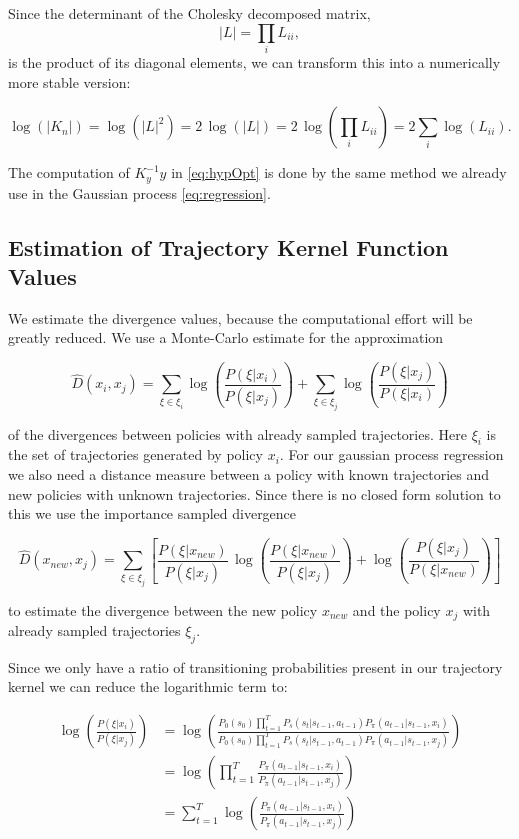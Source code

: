 Since the determinant of the Cholesky decomposed matrix,
$$|L| = \textstyle\prod_{i} L_{ii},$$
is the product of its diagonal elements, we can transform this into a numerically more stable version:

$$\log(|K_n|) = \log(|L|^{2}) = 2\,\log(|L|) = 2\,\log(\textstyle\prod_{i} L_{ii}) = 2\textstyle\sum_{i} \log(L_{ii}).$$

The computation of $K_y^{-1}y$ in \eqref{eq:hypOpt} is done by the same method we already use in the Gaussian process \eqref{eq:regression}.

\subsection{Estimation of Trajectory Kernel Function Values}

We estimate the divergence values, because the computational effort will be greatly reduced\cite{wilson2014using}. We use a Monte-Carlo estimate for the approximation

$$\hat{D}(x_{ i }, x_{ j }) = \sum _{\xi \in \xi_i} \log\left( \frac{P(\xi|x_{ i })}{P(\xi|x_{ j })} \right) + \sum _{\xi \in \xi_j} \log\left( \frac{P(\xi|x_{ j })}{P(\xi|x_{ i })} \right) $$

of the divergences between policies with already sampled trajectories. Here $\xi_i$ is the set of trajectories generated by policy $x_i$. For our gaussian process regression we also need a distance measure between a policy with known trajectories and new policies with unknown trajectories. Since there is no closed form solution to this we use the importance sampled divergence

$$\hat{D}(x_{ new }, x_{ j }) = \sum _{\xi \in \xi_j} \left[\frac{P(\xi|x_{ new })}{P(\xi|x_{ j })}\,\log\left(\frac{P(\xi|x_{new})}{P(\xi|x_{j})}\right)+\log\left(\frac{P(\xi|x_{ j })}{P(\xi|x_{ new })}\right)\right] $$

to estimate the divergence between the new policy $x_{new}$ and the policy $x_j$ with already sampled trajectories $\xi_j$.

Since we only have a ratio of transitioning probabilities present in our trajectory kernel we can reduce the logarithmic term to:

\begin{align*}
    \log\left(\frac{P(\xi|x_i)}{P(\xi|x_j)}\right)
    &= \log\left(\frac{P_{0}(s_{0}) \prod_{t=1}^{T} P_s(s_{t}|s_{t-1},a_{t-1}) P_{\pi}(a_{t-1}|s_{t-1},x_i)}{P_{0}(s_{0}) \prod_{t=1}^{T} P_s(s_{t}|s_{t-1},a_{t-1}) P_{\pi}(a_{t-1}|s_{t-1},x_j)}\right)\\
    &= \log\left(\prod_{t=1}^{T}\frac{ P_{\pi}(a_{t-1}|s_{t-1},x_i)}{P_{\pi}(a_{t-1}|s_{t-1},x_j)}\right)\\
    &= \sum_{t=1}^{T} \log \left(\frac{P_{\pi}(a_{t-1}|s_{t-1},x_i)}{P_{\pi}(a_{t-1}|s_{t-1},x_j)}\right)
\end{align*}



